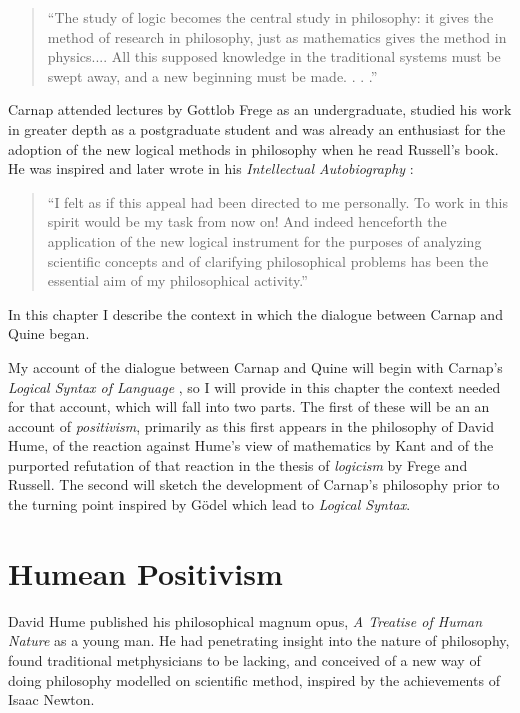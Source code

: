 \begin{quote}
``The study of logic becomes the central study in philosophy: it gives the method of research in philosophy, just as mathematics gives the method in physics....	
All this supposed knowledge in the traditional systems must be swept away, and a new beginning must be made. . . .''
\end{quote}

Carnap attended lectures by Gottlob Frege as an undergraduate, studied his work in greater depth as a postgraduate student
and was already an enthusiast for the adoption of the new logical methods in philosophy when he read Russell's
book.
He was inspired and later wrote in his \emph{Intellectual Autobiography}
\cite{carnap63,schilpp63}:

\begin{quotation}
``I felt as if this appeal had been directed to me personally.
To work in this spirit would be my task from now on! And indeed henceforth the application of the new logical instrument for the purposes of analyzing scientific concepts and of clarifying philosophical problems has been the essential aim of my philosophical activity.''
\end{quotation}

In this chapter I describe the context in which the dialogue between
Carnap and Quine began.

My account of the dialogue between Carnap and Quine will begin with Carnap's {\it Logical Syntax of Language} \cite{carnap34, carnap37}, so I will provide in this chapter the context needed for that account, which will fall into two parts.
The first of these will be an an account of \emph{positivism}, primarily as this first appears in the philosophy of David Hume, of the reaction against Hume's view of mathematics by Kant and of the purported refutation of that reaction in the thesis of \emph{logicism} by Frege and Russell.
The second will sketch the development of Carnap's philosophy prior to the turning point inspired by G\"odel which lead to {\it Logical Syntax}.

\section{Humean Positivism}

David Hume published his philosophical magnum opus, \emph{A Treatise of Human Nature} \cite{hume39}
as a young man.
He had penetrating insight into the nature of philosophy, found traditional metphysicians to
be lacking, and conceived of a new way of doing philosophy modelled on scientific method, inspired by the achievements of Isaac Newton.

